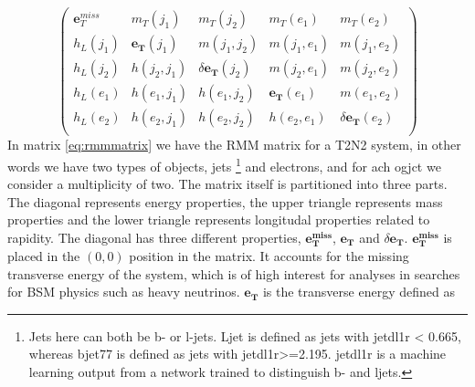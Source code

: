 \begin{equation}\label{eq:rmmmatrix}
\begin{pmatrix}
    \boldsymbol{e}_{T}^{miss} & m_T(j_1) & m_T(j_2) &  m_T(e_1) &  m_T(e_2)\\
    h_L(j_1) & \boldsymbol{e_T}(j_1) & m(j_1, j_2) & m(j_1, e_1) & m(j_1, e_2)\\
    h_L(j_2) & h(j_2, j_1) & \delta \boldsymbol{e_T}(j_2)& m(j_2, e_1) & m(j_2, e_2)\\
    h_L(e_1) & h(e_1, j_1) & h(e_1, j_2) & \boldsymbol{e_T}(e_1) & m(e_1, e_2)\\
    h_L(e_2) & h(e_2, j_1) & h(e_2, j_2) & h(e_2, e_1) & \delta \boldsymbol{e_T}(e_2)\\
\end{pmatrix}
\end{equation}
\newline
In matrix \ref{eq:rmmmatrix} we have the RMM matrix for a T2N2 system, in other words we have two types of objects, jets
\footnote{Jets here can both be b- or l-jets. Ljet is defined as jets with jetdl1r < 0.665, whereas bjet77 is defined as jets with jetdl1r>=2.195. 
jetdl1r is a machine learning output from a network trained to distinguish b- and ljets.} and electrons, and for ach ogjct we consider a multiplicity of two. 
The matrix itself is partitioned into three parts. 
The diagonal represents energy properties, the upper triangle represents mass properties and the lower triangle represents longitudal 
properties related to rapidity. The diagonal has three different properties, $\boldsymbol{e_T^{miss}}$, $\boldsymbol{e_T}$ and $\delta\boldsymbol{e_T}$. 
$\boldsymbol{e_T^{miss}}$ is placed in the $(0,0)$ position in the matrix. It accounts for the missing transverse energy of the system, which is of 
high interest for analyses in searches for BSM physics such as heavy neutrinos. $\boldsymbol{e_T}$ is the transverse energy defined as 

